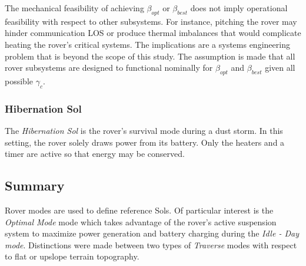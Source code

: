 The mechanical feasibility of achieving $\beta_{opt}$ or $\beta_{best}$ does not imply operational feasibility with respect to other subsystems. For instance, pitching the rover may hinder communication \ac{LOS} or produce thermal imbalances that would complicate heating the rover's critical systems. The implications are a systems engineering problem that is beyond the scope of this study. The assumption is made that all rover subsystems are designed to functional nominally for $\beta_{opt}$ and $\beta_{best}$ given all possible $\gamma_{c}$.



%

\subsubsection{Hibernation Sol}
\label{sec:ReferenceSols:HibernationSol}
The \textit{Hibernation Sol} is the rover's survival mode during a dust storm. In this setting, the rover solely draws power from its battery. Only the heaters and a timer are active so that energy may be conserved.



\subsection{Summary}
\label{sec:ReferenceSols:SummaryAndConclusion}
Rover modes are used to define reference Sols. Of particular interest is the \textit{Optimal Mode} mode which takes advantage of the rover's active suspension system to maximize power generation and battery charging during the \textit{Idle - Day mode}. Distinctions were made between two types of \textit{Traverse} modes with respect to flat or upslope terrain topography.

